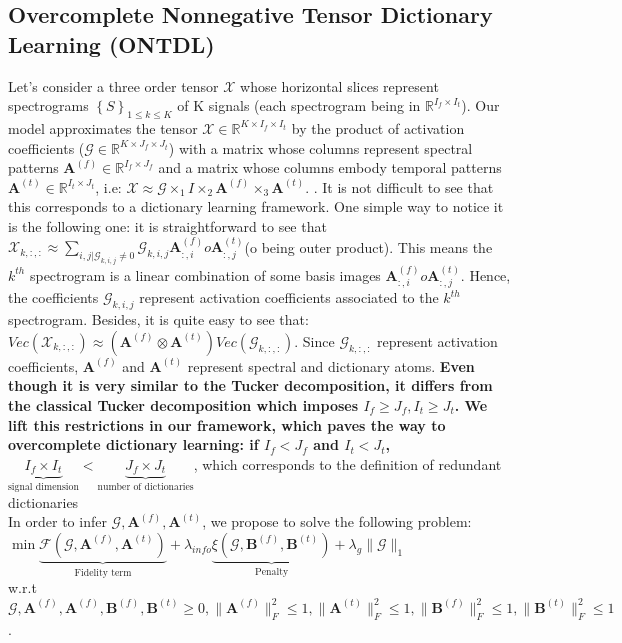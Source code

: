 \documentclass{article}
\def\tX{\boldsymbol{{\mathscr X}}}
\def\tG{\boldsymbol{{\mathscr G}}}
\def\A{{\mathbf A}}
\def\B{{\mathbf B}}
\begin{document}
\subsection{Overcomplete Nonnegative Tensor Dictionary Learning (ONTDL)}
Let's consider a three order tensor $\tX$ whose horizontal slices represent spectrograms $\left\{S\right\}_{1\leq k\leq K}$ of K signals (each spectrogram being in $\mathbb{R}^{I_{f}\times I_{t}}$). Our model approximates the tensor $\tX\in \mathbb{R}^{K\times I_{f}\times I_{t}}$ by the product of activation coefficients ($\tG\in\mathbb{R}^{K\times J_{f} \times J_{t}}$) with a matrix whose columns represent spectral patterns $\A^{(f)}\in\mathbb{R}^{I_{f}\times J_{f}}$ and a matrix whose columns embody temporal patterns $\A^{(t)}\in\mathbb{R}^{I_{t}\times J_{t}}$, i.e: $\tX \approx\tG\times_{1}I\times_{2}\A^{(f)}\times_{3}\A^{(t)}$. 
. It is not difficult to see that this corresponds to a dictionary learning framework. One simple way to notice it is the following one: it is straightforward to see that $\tX_{k,:,:}\approx \sum_{i,j|\tG_{k,i,j}\neq 0}\tG_{k,i,j}\A^{(f)}_{:,i}o\A^{(t)}_{:,j}$(o being outer product). This means the $k^{th}$ spectrogram is a linear combination of some basis images $\A^{(f)}_{:,i}o\A^{(t)}_{:,j}$. Hence, the coefficients $\tG_{k,i,j}$ represent activation coefficients associated to the $k^{th}$ spectrogram. Besides, it is quite easy to see that:$Vec(\tX_{k,:,:})\approx (\A^{(f)}\otimes \A^{(t)})Vec(\tG_{k,:,:})$. Since $\tG_{k,:,:}$ represent activation coefficients, $\A^{(f)}$ and $\A^{(t)}$ represent spectral and dictionary atoms.
\textbf{Even though it is very similar to the Tucker decomposition, it differs from the classical Tucker decomposition which imposes $I_{f}\geq J_{f},I_{t}\geq J_{t}$.  We lift this restrictions in our framework, which paves the way to overcomplete dictionary learning: if $I_{f}< J_{f}$ and $I_{t}<J_{t}$,  $\underbrace {I_{f}\times I_{t}}_{\text{signal dimension}}<\underbrace{J_{f}\times J_{t}}_{\text{number of dictionaries}}$}, which corresponds to the definition of redundant dictionaries\\
In order to infer $\tG,\A^{(f)},\A^{(t)}$, we propose to solve the
following problem:\\
$\min \underbrace{ \mathcal{F}(\tG,\A^{(f)},\A^{(t)})}_{\text{Fidelity term}}+\lambda_{info} \underbrace{\xi(\tG,\B^{(f)},\B^{(t)})}_{\text{Penalty}}+\lambda_{g}\|\tG\|_{1}$\\
w.r.t $\tG,\A^{(f)},\A^{(f)},\B^{(f)},\B^{(t)}\geq 0,\|\A^{(f)}\|^{2}_{F}\leq 1,\|\A^{(t)}\|^{2}_{F}\leq 1,\|\B^{(f)}\|^{2}_{F}\leq 1,\|\B^{(t)}\|^{2}_{F}\leq 1$.\\
\end{document}
